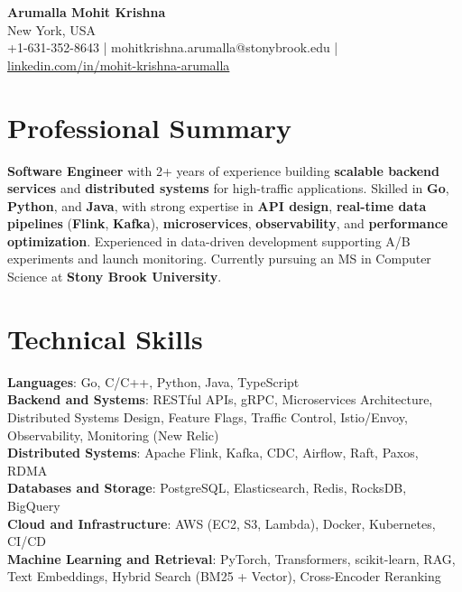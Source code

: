 \documentclass[letterpaper,11pt]{article}
\begin{document}
\begin{center}
  {\Large \textbf{Arumalla Mohit Krishna}} \\
  New York, USA \\
  +1-631-352-8643 \enspace | \enspace mohitkrishna.arumalla@stonybrook.edu \enspace | \enspace \href{https://www.linkedin.com/in/mohit-krishna-arumalla}{linkedin.com/in/mohit-krishna-arumalla}
\end{center}

\section{Professional Summary}
  \begin{itemize}[leftmargin=0.15in, label={}]
    \small{\item{
     \textbf{Software Engineer} with 2+ years of experience building \textbf{scalable backend services} and \textbf{distributed systems} for high-traffic applications. Skilled in \textbf{Go}, \textbf{Python}, and \textbf{Java}, with strong expertise in \textbf{API design}, \textbf{real-time data pipelines} (\textbf{Flink}, \textbf{Kafka}), \textbf{microservices}, \textbf{observability}, and \textbf{performance optimization}. Experienced in data-driven development supporting A/B experiments and launch monitoring. Currently pursuing an MS in Computer Science at \textbf{Stony Brook University}.
    }}
  \end{itemize}
\vspace{-16pt}

\section{Technical Skills}
 \begin{itemize}[leftmargin=0.15in, label={}]
    \small{\item{
     \textbf{Languages}: Go, C/C++, Python, Java, TypeScript \\
     \textbf{Backend and Systems}: RESTful APIs, gRPC, Microservices Architecture, Distributed Systems Design, Feature Flags, Traffic Control, Istio/Envoy, Observability, Monitoring (New Relic) \\
     \textbf{Distributed Systems}: Apache Flink, Kafka, CDC, Airflow, Raft, Paxos, RDMA \\
     \textbf{Databases and Storage}: PostgreSQL, Elasticsearch, Redis, RocksDB, BigQuery \\
     \textbf{Cloud and Infrastructure}: AWS (EC2, S3, Lambda), Docker, Kubernetes, CI/CD \\
     \textbf{Machine Learning and Retrieval}: PyTorch, Transformers, scikit-learn, RAG, Text Embeddings, Hybrid Search (BM25 + Vector), Cross-Encoder Reranking
    }}
 \end{itemize}
\vspace{-16pt}
\end{document}
